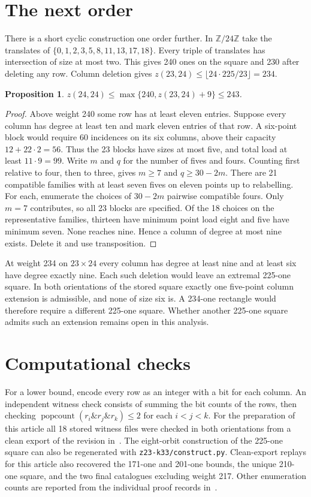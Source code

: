 \documentclass[11pt]{article}
\newtheorem{proposition}[theorem]{Proposition}
\newcommand{\code}[1]{\nolinkurl{#1}}
\begin{document}
\section{The next order}\label{sec:24}
There is a short cyclic construction one order further. In
$\mathbb Z/24\mathbb Z$ take the translates of
$\{0,1,2,3,5,8,11,13,17,18\}$. Every triple of translates has
intersection of size at most two. This gives 240 ones on the square
and 230 after deleting any row. Column deletion gives
$z(23,24)\le\lfloor24\cdot225/23\rfloor=234$.

\begin{proposition}
$z(24,24)\le\max\{240,z(23,24)+9\}\le243$.
\end{proposition}
\begin{proof}
Above weight 240 some row has at least eleven entries. Suppose every
column has degree at least ten and mark eleven entries of that row.
A six-point block would require 60 incidences on its six columns,
above their capacity $12+22\cdot2=56$. Thus the 23 blocks have sizes
at most five, and total load at least $11\cdot9=99$. Write $m$ and $q$
for the number of fives and fours. Counting first relative to four,
then to three, gives $m\ge7$ and $q\ge30-2m$. There are 21 compatible
families with at least seven fives on eleven points up to relabelling.
For each, enumerate the choices of $30-2m$ pairwise compatible fours.
Only $m=7$ contributes, so all 23 blocks are specified. Of the
18 choices on the representative families, thirteen have minimum point
load eight and five have minimum seven. None reaches nine. Hence a
column of degree at most nine exists. Delete it and use transposition.
\end{proof}

At weight 234 on $23\times24$ every column has degree at least nine
and at least six have degree exactly nine. Each such deletion would
leave an extremal 225-one square. In both orientations of the stored
square exactly one five-point column extension is admissible, and
none of size six is. A 234-one rectangle would therefore require a
different 225-one square. Whether another 225-one square admits such an extension remains open in this analysis.

\section{Computational checks}\label{sec:replay}
For a lower bound, encode every row as an integer with a bit for each
column. An independent witness check consists of summing the bit counts
of the rows, then checking
$\operatorname{popcount}(r_i\mathbin{\&} r_j\mathbin{\&}r_k)\le2$ for
each $i<j<k$. For the preparation of this article all 18 stored witness
files were checked in both orientations from a clean export of the
revision in~\cite{code}. The eight-orbit construction of the 225-one
square can also be regenerated with \code{z23-k33/construct.py}. Clean-export replays for this article
also recovered the 171-one and 201-one bounds, the unique 210-one square,
and the two final catalogues excluding weight 217. Other enumeration
counts are reported from the individual proof records in~\cite{code}.
\end{document}
